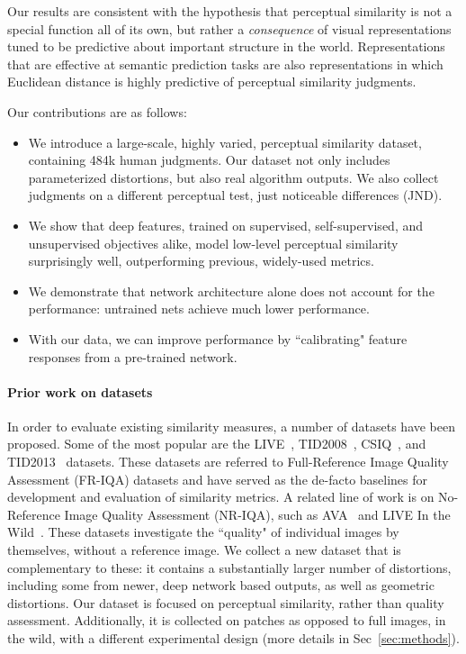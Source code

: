 Our results are consistent with the hypothesis that perceptual similarity is not a special function all of its own, but rather a {\em consequence} of visual representations tuned to be predictive about important structure in the world. Representations that are effective at semantic prediction tasks are also representations in which Euclidean distance is highly predictive of perceptual similarity judgments.

Our contributions are as follows:

\begin{itemize}[noitemsep,nolistsep]
    \item We introduce a large-scale, highly varied, perceptual similarity dataset, containing 484k human judgments. Our dataset not only includes parameterized distortions, but also real algorithm outputs. We also collect judgments on a different perceptual test, just noticeable differences (JND).
    
    \item We show that deep features, trained on supervised, self-supervised, and unsupervised objectives alike, model low-level perceptual similarity surprisingly well, outperforming previous, widely-used metrics.
    
    \item We demonstrate that network architecture alone does not account for the performance: untrained nets achieve much lower performance.
    
    \item With our data, we can improve performance by ``calibrating" feature responses from a pre-trained network.
    
\end{itemize}

\paragraph{Prior work on datasets}
%
In order to evaluate existing similarity measures, a number of datasets have been proposed. Some of the most popular are the LIVE~\cite{sheikh2006statistical}, TID2008~\cite{ponomarenko2009tid2008},  CSIQ~\cite{larson2010most}, and TID2013~\cite{ponomarenko2015image} datasets. These datasets are referred to Full-Reference Image Quality Assessment (FR-IQA) datasets and have served as the de-facto baselines for development and evaluation of similarity metrics. A related line of work is on No-Reference Image Quality Assessment (NR-IQA), such as AVA~\cite{murray2012ava} and LIVE In the Wild~\cite{ghadiyaram2016massive}. These datasets investigate the ``quality" of individual images by themselves, without a reference image.
We collect a new dataset that is complementary to these: it contains a substantially larger number of distortions, including some from newer, deep network based outputs, as well as geometric distortions. Our dataset is focused on perceptual similarity, rather than quality assessment. Additionally, it is collected on patches as opposed to full images, in the wild, with a different experimental design (more details in Sec~\ref{sec:methods}).

